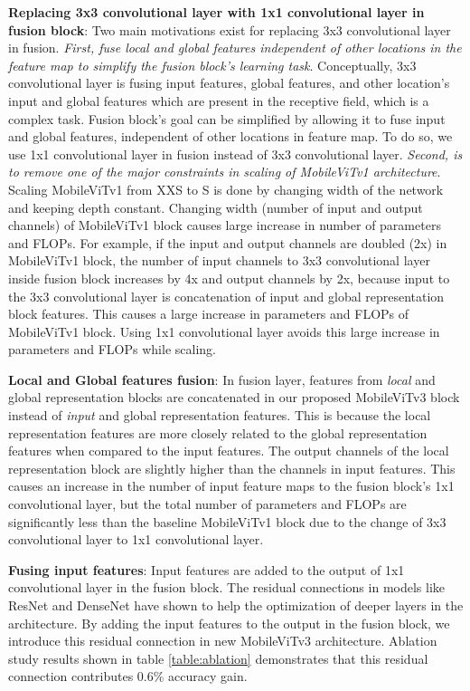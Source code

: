 \documentclass{article} \usepackage{iclr2022_conference,times}
\begin{document}
\textbf{Replacing 3x3 convolutional layer with 1x1 convolutional layer in fusion block}: 
Two main motivations exist for replacing 3x3 convolutional layer in fusion.
\textit{First, fuse local and global features independent of other locations in the feature map to simplify the fusion block's learning task}. 
Conceptually, 3x3 convolutional layer is fusing input features, global features, and other location's input and global features which are present in the receptive field, which is a complex task. 
Fusion block's goal can be simplified by allowing it to fuse input and global features, independent of other locations in feature map. 
To do so, we use 1x1 convolutional layer in fusion instead of 3x3 convolutional layer.
\textit{Second, is to remove one of the major constraints in scaling of MobileViTv1 architecture}. 
Scaling MobileViTv1 from XXS to S is done by changing width of the network and keeping depth constant. 
Changing width (number of input and output channels) of MobileViTv1 block causes large increase in number of parameters and FLOPs. 
For example, if the input and output channels are doubled (2x) in MobileViTv1 block, the number of input channels to 3x3 convolutional layer inside fusion block increases by 4x and output channels by 2x, because input to the 3x3 convolutional layer is concatenation of input and global representation block features. This causes a large increase in parameters and FLOPs of MobileViTv1 block. Using 1x1 convolutional layer avoids this large increase in parameters and FLOPs while scaling.
 





\textbf{Local and Global features fusion}: 
In fusion layer, features from \textit{local} and global representation blocks are concatenated in our proposed MobileViTv3 block instead of \textit{input} and global representation features.
This is because the local representation features are more closely related to the global representation features when compared to the input features.
The output channels of the local representation block are slightly higher than the channels in input features.
This causes an increase in the number of input feature maps to the fusion block's 1x1 convolutional layer, but the total number of parameters and FLOPs are significantly less than the baseline MobileViTv1 block due to the change of 3x3 convolutional layer to 1x1 convolutional layer.

\textbf{Fusing input features}: 
Input features are added to the output of 1x1 convolutional layer in the fusion block. 
The residual connections in models like ResNet and DenseNet have shown to help the optimization of deeper layers in the architecture. 
By adding the input features to the output in the fusion block, we introduce this residual connection in new MobileViTv3 architecture.
Ablation study results shown in table \ref{table:ablation} demonstrates that this residual connection contributes 0.6\% accuracy gain.
\end{document}
